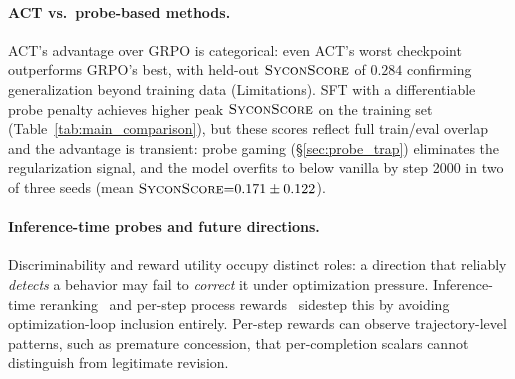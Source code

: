 \paragraph{ACT vs.\ probe-based methods.}
ACT's advantage over GRPO is categorical: even ACT's worst checkpoint outperforms GRPO's best, with held-out $\textsc{SyconScore}$ of $0.284$ confirming generalization beyond training data (Limitations).
SFT with a differentiable probe penalty achieves higher peak $\textsc{SyconScore}$ on the training set (Table~\ref{tab:main_comparison}), but these scores reflect full train/eval overlap and the advantage is transient: probe gaming (\S\ref{sec:probe_trap}) eliminates the regularization signal, and the model overfits to below vanilla by step 2000 in two of three seeds (mean $\textsc{SyconScore}{=}0.171 \pm 0.122$).

\paragraph{Inference-time probes and future directions.}
Discriminability and reward utility occupy distinct roles: a direction that reliably \emph{detects} a behavior may fail to \emph{correct} it under optimization pressure.
Inference-time reranking~\citep{papadatos2024probepenalties} and per-step process rewards~\citep{beigi2025smart} sidestep this by avoiding optimization-loop inclusion entirely.
Per-step rewards can observe trajectory-level patterns, such as premature concession, that per-completion scalars cannot distinguish from legitimate revision.
